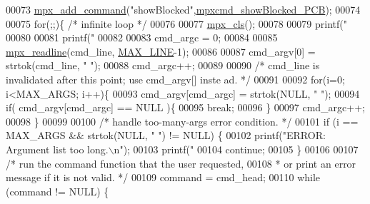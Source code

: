 \begin{DoxyCode}
00073         \hyperlink{mpx__cmd_8c_a52c02eb85fda9ac4278e10088a192e89}{mpx_add_command}(\textcolor{stringliteral}{"showBlocked"},\hyperlink{mpx__r2_8c_ae1ef92a5e3a8869ec269a23b3b854c9b}{mpxcmd_showBlocked_PCB});
00074 
00075         \textcolor{keywordflow}{for}(;;)\{ \textcolor{comment}{/* infinite loop */}
00076 
00077                 \hyperlink{mpx__util_8c_a8cf3281978ba1652fd5d643e1a41f70b}{mpx_cls}();
00078 
00079                 printf(\textcolor{stringliteral}{"%
00080 
00081                 printf(\textcolor{stringliteral}{"%
00082 
00083                 cmd\_argc = 0;
00084 
00085                 \hyperlink{mpx__util_8c_a781169ab05ad54c0d37253d73060b77f}{mpx_readline}(cmd\_line, \hyperlink{mpx__cmd_8h_a842ed03f27719bc87666bfd1f75415b8}{MAX_LINE}-1);     
00086 
00087                 cmd\_argv[0] = strtok(cmd\_line, \textcolor{stringliteral}{" "});
00088                 cmd\_argc++;
00089 
00090                 \textcolor{comment}{/* cmd\_line is invalidated after this point; use cmd\_argv[] inste
      ad. */}
00091 
00092                 \textcolor{keywordflow}{for}(i=0; i<MAX\_ARGS; i++)\{
00093                         cmd\_argv[cmd\_argc] = strtok(NULL, \textcolor{stringliteral}{" "});
00094                         \textcolor{keywordflow}{if}( cmd\_argv[cmd\_argc] == NULL )\{
00095                                 \textcolor{keywordflow}{break};
00096                         \}
00097                         cmd\_argc++;
00098                 \}
00099 
00100                 \textcolor{comment}{/* handle too-many-args error condition. */}
00101                 \textcolor{keywordflow}{if} (i == MAX\_ARGS && strtok(NULL, \textcolor{stringliteral}{" "}) != NULL) \{
00102                         printf(\textcolor{stringliteral}{"ERROR: Argument list too long.\(\backslash\)n"});
00103                         printf(\textcolor{stringliteral}{"%
00104                         \textcolor{keywordflow}{continue};
00105                 \}
00106 
00107                 \textcolor{comment}{/* run the command function that the user requested,}
00108 \textcolor{comment}{                 * or print an error message if it is not valid. */}
00109                 command = cmd\_head;
00110                 \textcolor{keywordflow}{while} (command != NULL) \{
}}}
\end{DoxyCode}
